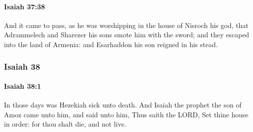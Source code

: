 		\paragraph{Isaiah 37:38} %
			\label{ISAIAH-37-38}

			And it came to pass, as he was worshipping in the house of Nisroch his god, that Adrammelech and Sharezer his sons smote him with the sword; and they escaped into the land of Armenia: and Esarhaddon his son reigned in his stead.

	\subsubsection{Isaiah 38} %
		\label{ISAIAH-38}

		\paragraph{Isaiah 38:1} %
			\label{ISAIAH-38-1}

			In those days was Hezekiah sick unto death. And Isaiah the prophet the son of Amoz came unto him, and said unto him, Thus saith the LORD, Set thine house in order: for thou shalt die, and not live.

